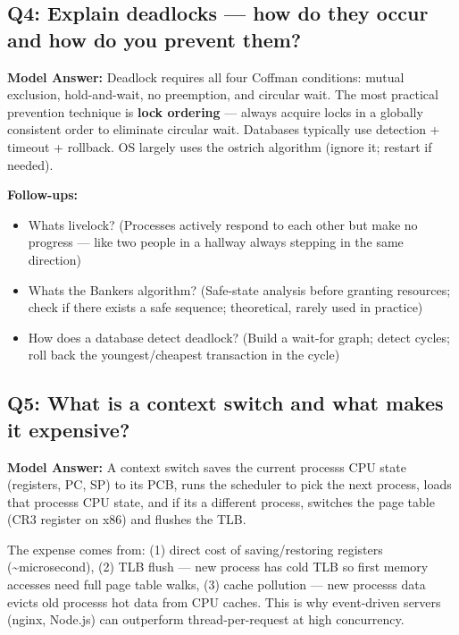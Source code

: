 \documentclass[11pt]{article}
\providecommand{\tightlist}{\setlength{\itemsep}{1pt}\setlength{\parskip}{0pt}}
\begin{document}
\subsection{Q4: Explain deadlocks --- how do they occur and how do you prevent them?}\label{q4-explain-deadlocks--how-do-they-occur-and-how-do-you-prevent-them}

\textbf{Model Answer:} Deadlock requires all four Coffman conditions: mutual exclusion, hold-and-wait, no preemption, and circular wait. The most practical prevention technique is \textbf{lock ordering} --- always acquire locks in a globally consistent order to eliminate circular wait. Databases typically use detection + timeout + rollback. OS largely uses the ostrich algorithm (ignore it; restart if needed).

\textbf{Follow-ups:}

\begin{itemize}
\tightlist
\item
  What\textquotesingle s livelock? (Processes actively respond to each other but make no progress --- like two people in a hallway always stepping in the same direction)
\item
  What\textquotesingle s the Banker\textquotesingle s algorithm? (Safe-state analysis before granting resources; check if there exists a safe sequence; theoretical, rarely used in practice)
\item
  How does a database detect deadlock? (Build a wait-for graph; detect cycles; roll back the youngest/cheapest transaction in the cycle)
\end{itemize}

\subsection{Q5: What is a context switch and what makes it expensive?}\label{q5-what-is-a-context-switch-and-what-makes-it-expensive}

\textbf{Model Answer:} A context switch saves the current process\textquotesingle s CPU state (registers, PC, SP) to its PCB, runs the scheduler to pick the next process, loads that process\textquotesingle s CPU state, and if it\textquotesingle s a different process, switches the page table (CR3 register on x86) and flushes the TLB.

The expense comes from: (1) direct cost of saving/restoring registers (\textasciitilde microsecond), (2) TLB flush --- new process has cold TLB so first memory accesses need full page table walks, (3) cache pollution --- new process\textquotesingle s data evicts old process\textquotesingle s hot data from CPU caches. This is why event-driven servers (nginx, Node.js) can outperform thread-per-request at high concurrency.
\end{document}
